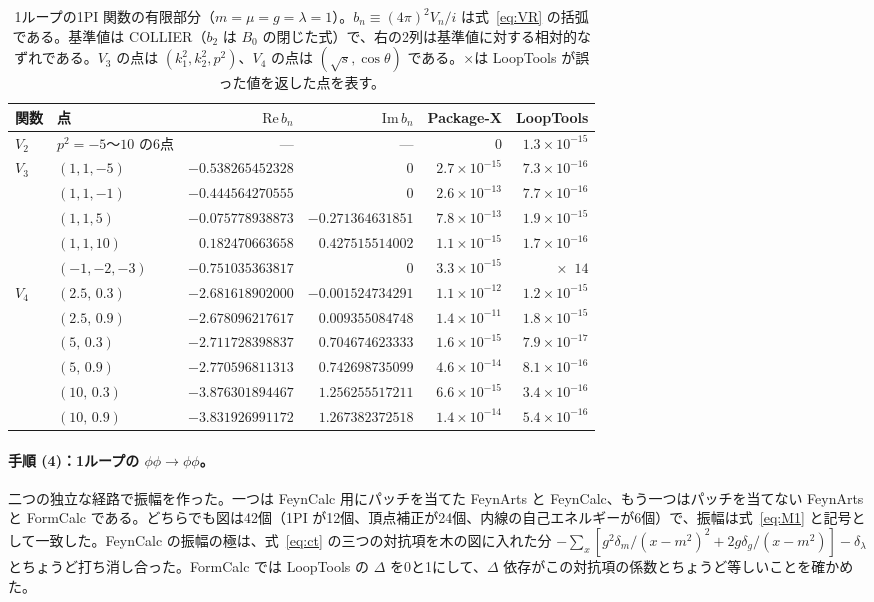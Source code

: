 \documentclass[a4paper,10pt]{ltjsarticle}
\begin{document}
\begin{table}[tbp]
\centering\small
\caption{1ループの1PI 関数の有限部分（$m=\mu=g=\lambda=1$）。$b_n\equiv(4\pi)^2V_n/i$ は式~\eqref{eq:VR} の括弧である。基準値は COLLIER（$b_2$ は $B_0$ の閉じた式）で、右の2列は基準値に対する相対的なずれである。$V_3$ の点は $(k_1^2,k_2^2,p^2)$、$V_4$ の点は $(\sqrt s,\cos\theta)$ である。×は LoopTools が誤った値を返した点を表す。}
\label{tab:oneloop}
\begin{tabular}{llrrrr}
\toprule
関数 & 点 & $\mathrm{Re}\,b_n$ & $\mathrm{Im}\,b_n$ & Package-X & LoopTools \\
\midrule
$V_2$ & $p^2=-5$〜$10$ の6点 & — & — & $0$ & $1.3\times10^{-15}$ \\
\midrule
$V_3$ & $(1,1,-5)$ & $-0.538265452328$ & $0$ & $2.7\times10^{-15}$ & $7.3\times10^{-16}$ \\
 & $(1,1,-1)$ & $-0.444564270555$ & $0$ & $2.6\times10^{-13}$ & $7.7\times10^{-16}$ \\
 & $(1,1,5)$ & $-0.075778938873$ & $-0.271364631851$ & $7.8\times10^{-13}$ & $1.9\times10^{-15}$ \\
 & $(1,1,10)$ & $0.182470663658$ & $0.427515514002$ & $1.1\times10^{-15}$ & $1.7\times10^{-16}$ \\
 & $(-1,-2,-3)$ & $-0.751035363817$ & $0$ & $3.3\times10^{-15}$ & ×\ $14$ \\
\midrule
$V_4$ & $(2.5,\,0.3)$ & $-2.681618902000$ & $-0.001524734291$ & $1.1\times10^{-12}$ & $1.2\times10^{-15}$ \\
 & $(2.5,\,0.9)$ & $-2.678096217617$ & $0.009355084748$ & $1.4\times10^{-11}$ & $1.8\times10^{-15}$ \\
 & $(5,\,0.3)$ & $-2.711728398837$ & $0.704674623333$ & $1.6\times10^{-15}$ & $7.9\times10^{-17}$ \\
 & $(5,\,0.9)$ & $-2.770596811313$ & $0.742698735099$ & $4.6\times10^{-14}$ & $8.1\times10^{-16}$ \\
 & $(10,\,0.3)$ & $-3.876301894467$ & $1.256255517211$ & $6.6\times10^{-15}$ & $3.4\times10^{-16}$ \\
 & $(10,\,0.9)$ & $-3.831926991172$ & $1.267382372518$ & $1.4\times10^{-14}$ & $5.4\times10^{-16}$ \\
\bottomrule
\end{tabular}
\end{table}

\paragraph{手順 (4)：1ループの $\phi\phi\to\phi\phi$。}二つの独立な経路で振幅を作った。一つは FeynCalc 用にパッチを当てた FeynArts と FeynCalc、もう一つはパッチを当てない FeynArts と FormCalc である。どちらでも図は42個（1PI が12個、頂点補正が24個、内線の自己エネルギーが6個）で、振幅は式~\eqref{eq:M1} と記号として一致した。FeynCalc の振幅の極は、式~\eqref{eq:ct} の三つの対抗項を木の図に入れた分 $-\sum_x[g^2\delta_m/(x-m^2)^2+2g\delta_g/(x-m^2)]-\delta_\lambda$ とちょうど打ち消し合った。FormCalc では LoopTools の $\Delta$ を0と1にして、$\Delta$ 依存がこの対抗項の係数とちょうど等しいことを確かめた。
\end{document}
